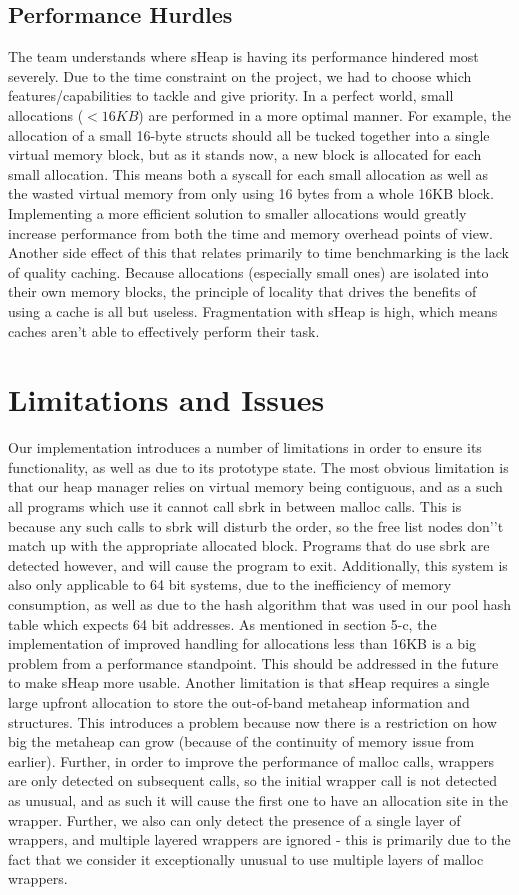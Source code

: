 \documentclass[conference]{IEEEtran}
\begin{document}
\subsection{Performance Hurdles}
The team understands where sHeap is having its performance hindered most severely. Due to 
the time constraint on the project, we had to choose which features/capabilities to tackle 
and give priority. In a perfect world, small allocations ($<16KB$) are performed in a more 
optimal manner. For example, the allocation of a small 16-byte structs should all be tucked 
together into a single virtual memory block, but as it stands now, a new block is allocated 
for each small allocation. This means both a syscall for each small allocation as well as 
the wasted virtual memory from only using 16 bytes from a whole 16KB block. Implementing a 
more efficient solution to smaller allocations would greatly increase performance from both 
the time and memory overhead points of view. Another side effect of this that relates 
primarily to time benchmarking is the lack of quality caching. Because allocations (especially 
small ones) are isolated into their own memory blocks, the principle of locality that drives 
the benefits of using a cache is all but useless. Fragmentation with sHeap is high, which means 
caches aren’t able to effectively perform their task.

\section{Limitations and Issues}
Our implementation introduces a number of limitations in order to ensure its functionality, as 
well as due to its prototype state. The most obvious limitation is that our heap manager 
relies on virtual memory being contiguous, and as a such all programs which use it cannot call 
sbrk in between malloc calls. This is because any such calls to sbrk will disturb the order, 
so the free list nodes don'’t match up with the appropriate allocated block. Programs that do use 
sbrk are detected however, and will cause the program to exit. Additionally, this system is 
also only applicable to 64 bit systems, due to the inefficiency of memory consumption, as well 
as due to the hash algorithm that was used in our pool hash table which expects 64 bit addresses. As mentioned in section 5-c, 
the implementation of improved handling for allocations less than 16KB is a big problem from a 
performance standpoint. This should be addressed in the future to make sHeap more usable. 
Another limitation is that sHeap requires a single large upfront allocation to store the 
out-of-band metaheap information and structures. This introduces a problem because now there is 
a restriction on how big the metaheap can grow (because of the continuity of memory issue from 
earlier). Further, in order to improve the performance of malloc calls, wrappers are only 
detected on subsequent calls, so the initial wrapper call is not detected as unusual, and as 
such it will cause the first one to have an allocation site in the wrapper. Further, we also 
can only detect the presence of a single layer of wrappers, and multiple layered wrappers are 
ignored - this is primarily due to the fact that we consider it exceptionally unusual to use 
multiple layers of malloc wrappers.
\end{document}
